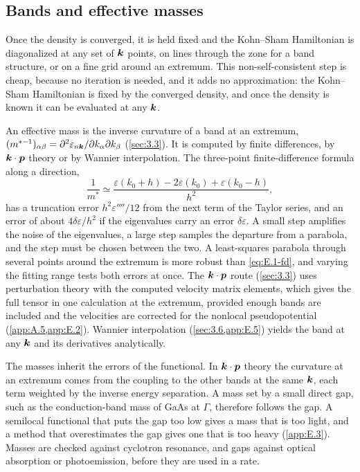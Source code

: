 \subsection{Bands and effective masses}

Once the density is converged, it is held fixed and the Kohn--Sham Hamiltonian is diagonalized at any set of $\bm{k}$ points, on lines through the zone for a band structure, or on a fine grid around an extremum. This non-self-consistent step is cheap, because no iteration is needed, and it adds no approximation: the Kohn--Sham Hamiltonian is fixed by the converged density, and once the density is known it can be evaluated at any $\bm{k}$.

An effective mass is the inverse curvature of a band at an extremum, $(m^{*-1})_{\alpha\beta} = \partial^2\varepsilon_{n\bm{k}}/\partial k_\alpha\partial k_\beta$ (\cref{sec:3.3}). It is computed by finite differences, by $\bm{k}\cdot\bm{p}$ theory or by Wannier interpolation. The three-point finite-difference formula along a direction,
\begin{equation}
  \frac{1}{m^*} \simeq \frac{\varepsilon(k_0 + h) - 2\varepsilon(k_0) + \varepsilon(k_0 - h)}{h^2} ,
  \label{eq:E.1-fd}
\end{equation}
has a truncation error $h^2\varepsilon''''/12$ from the next term of the Taylor series, and an error of about $4\delta\varepsilon/h^2$ if the eigenvalues carry an error $\delta\varepsilon$. A small step amplifies the noise of the eigenvalues, a large step samples the departure from a parabola, and the step must be chosen between the two. A least-squares parabola through several points around the extremum is more robust than \cref{eq:E.1-fd}, and varying the fitting range tests both errors at once. The $\bm{k}\cdot\bm{p}$ route (\cref{sec:3.3}) uses perturbation theory with the computed velocity matrix elements, which gives the full tensor in one calculation at the extremum, provided enough bands are included and the velocities are corrected for the nonlocal pseudopotential (\cref{app:A.5,app:E.2}). Wannier interpolation (\cref{sec:3.6,app:E.5}) yields the band at any $\bm{k}$ and its derivatives analytically.

The masses inherit the errors of the functional. In $\bm{k}\cdot\bm{p}$ theory the curvature at an extremum comes from the coupling to the other bands at the same $\bm{k}$, each term weighted by the inverse energy separation. A mass set by a small direct gap, such as the conduction-band mass of GaAs at $\Gamma$, therefore follows the gap. A semilocal functional that puts the gap too low gives a mass that is too light, and a method that overestimates the gap gives one that is too heavy (\cref{app:E.3}). Masses are checked against cyclotron resonance, and gaps against optical absorption or photoemission, before they are used in a rate.

